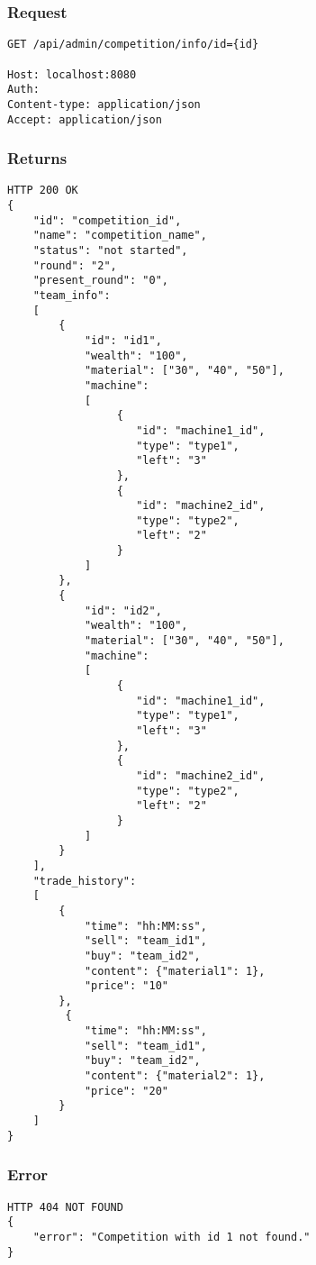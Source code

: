 \documentclass{article}
\begin{document}
\subsubsection*{Request}
\begin{lstlisting}
GET /api/admin/competition/info/id={id}

Host: localhost:8080
Auth:
Content-type: application/json
Accept: application/json
\end{lstlisting}

\subsubsection*{Returns}
\begin{lstlisting}
HTTP 200 OK
{
    "id": "competition_id",
    "name": "competition_name",
    "status": "not started",
    "round": "2",
    "present_round": "0",
    "team_info":
    [
        {
            "id": "id1",
            "wealth": "100",
            "material": ["30", "40", "50"],
            "machine":
            [
                 {
                    "id": "machine1_id",
                    "type": "type1",
                    "left": "3"
                 },
                 {
                    "id": "machine2_id",
                    "type": "type2",
                    "left": "2"
                 }
            ]
        },
        {
            "id": "id2",
            "wealth": "100",
            "material": ["30", "40", "50"],
            "machine":
            [
                 {
                    "id": "machine1_id",
                    "type": "type1",
                    "left": "3"
                 },
                 {
                    "id": "machine2_id",
                    "type": "type2",
                    "left": "2"
                 }
            ]
        }
    ],
    "trade_history":
    [
        {
            "time": "hh:MM:ss",
            "sell": "team_id1",
            "buy": "team_id2",
            "content": {"material1": 1},
            "price": "10"
        },
         {
            "time": "hh:MM:ss",
            "sell": "team_id1",
            "buy": "team_id2",
            "content": {"material2": 1},
            "price": "20"
        }
    ]
}

\end{lstlisting}

\subsubsection*{Error}
\begin{lstlisting}
HTTP 404 NOT FOUND
{
    "error": "Competition with id 1 not found."
}
\end{lstlisting}
\end{document}
